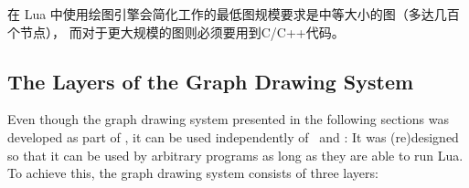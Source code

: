 在 Lua 中使用绘图引擎会简化工作的最低图规模要求是中等大小的图（多达几百个节点），
而对于更大规模的图则必须要用到C/C++代码。


\subsection{The Layers of the Graph Drawing System}

\label{section-gd-layers}

Even though the graph drawing system presented in the following
sections was developed as part of \pgfname, it can be used
independently of \pgfname\ and \tikzname: It was (re)designed so that
it can be used by arbitrary programs as long as they are able to run
Lua. To achieve this, the graph drawing system consists of three
layers:

